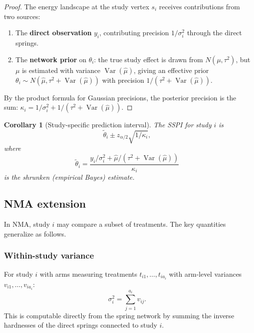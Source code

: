\documentclass[12pt]{article}
\newcommand{\Var}{\operatorname{Var}}
\newtheorem{corollary}{Corollary}
\begin{document}
\begin{proof}
The energy landscape at the study vertex $s_i$ receives contributions
from two sources:
\begin{enumerate}
  \item The \textbf{direct observation} $y_i$, contributing precision
    $1/\sigma_i^2$ through the direct springs.
  \item The \textbf{network prior} on $\theta_i$: the true study effect
    is drawn from $N(\mu, \tau^2)$, but $\mu$ is estimated with variance
    $\Var(\hat\mu)$, giving an effective prior
    $\theta_i \sim N(\hat\mu, \tau^2 + \Var(\hat\mu))$ with precision
    $1/(\tau^2 + \Var(\hat\mu))$.
\end{enumerate}
By the product formula for Gaussian precisions, the posterior precision
is the sum:
$\kappa_i = 1/\sigma_i^2 + 1/(\tau^2 + \Var(\hat\mu))$.
\end{proof}

\begin{corollary}[Study-specific prediction interval]
The SSPI for study $i$ is
\begin{equation}\label{eq:sspi}
  \tilde\theta_i \pm z_{\alpha/2} \sqrt{1/\kappa_i},
\end{equation}
where
\begin{equation}\label{eq:shrunk}
  \tilde\theta_i
    = \frac{y_i / \sigma_i^2 + \hat\mu / (\tau^2 + \Var(\hat\mu))}
           {\kappa_i}
\end{equation}
is the shrunken (empirical Bayes) estimate.
\end{corollary}

\subsection{NMA extension}

In NMA, study $i$ may compare a subset of treatments.  The key
quantities generalize as follows.

\subsubsection{Within-study variance}

For study $i$ with arms measuring treatments $t_{i1}, \ldots, t_{ia_i}$
with arm-level variances $v_{i1}, \ldots, v_{ia_i}$:
\begin{equation}\label{eq:sigma2_nma}
  \sigma_i^2 = \sum_{j=1}^{a_i} v_{ij}.
\end{equation}
This is computable directly from the spring network by summing the
inverse hardnesses of the direct springs connected to study $i$.
\end{document}
